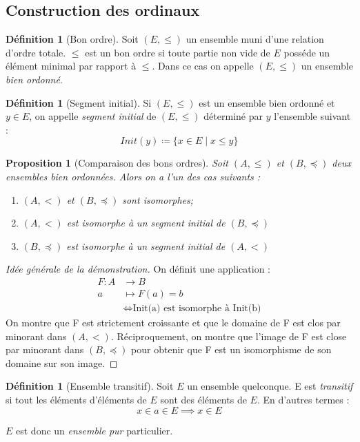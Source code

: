 \documentclass[french]{article}
\theoremstyle{definition}
\newtheorem{definition}[subsubsection]{Définition}
\theoremstyle{plain}
\newtheorem{proposition}[subsubsection]{Proposition}
\theoremstyle{plain}
\theoremstyle{plain}
\theoremstyle{plain}
\theoremstyle{plain}
\begin{document}
\subsection{Construction des ordinaux} 

\begin{definition}[Bon ordre]
	Soit \( (E,\le) \) un ensemble muni d'une relation d'ordre totale. \( \le \) est un bon ordre si toute partie non vide de \( E \) posséde un élément minimal par rapport à \( \le \). Dans ce cas on appelle \( (E,\le) \) un ensemble \textit{bien ordonné}.	
\end{definition}

\begin{definition}[Segment initial]
	Si \( (E,\le) \) est un ensemble bien ordonné et \( y \in E\), on appelle \textit{segment initial} de \( (E,\le) \) déterminé par \( y \) l'ensemble suivant :
	\begin{equation*}
		Init(y) \coloneqq \{ x \in E \mid x \le y \}
	\end{equation*}
\end{definition}

\begin{proposition}[Comparaison des bons ordres]
	Soit \( (A,\le) \) et \( (B,\preceq) \) deux ensembles bien ordonnées. Alors on a l'un des cas suivants :
	\begin{enumerate}[label = (\roman*)]
		\item \( (A,<) \) et \( (B,\preceq) \) sont isomorphes;
		\item \( (A,<) \) est isomorphe à un segment initial de \( (B,\preceq) \)
		\item \( (B,\preceq) \) est isomorphe à un segment initial de \( (A,<) \)
	\end{enumerate}
\end{proposition}
\begin{proof}[Idée générale de la démonstration]
	On définit une application :
	\begin{align*}
		F : A &\rightarrow B \\
		a &\mapsto F(a) = b \\
			       &\Leftrightarrow \text{Init(a) est isomorphe à Init(b)}
	\end{align*}
	On montre que F est strictement croissante et que le domaine de F est clos par minorant dans \( (A,<) \). Réciproquement, on montre que l'image de F est close par minorant dans \( (B,\preceq) \) pour obtenir que F est un isomorphisme de son domaine sur son image.
\end{proof}
\begin{definition}[Ensemble transitif]
	Soit \( E \) un ensemble quelconque. E est \textit{transitif} si tout les éléments d'éléments de \( E \) sont des éléments de \( E \). En d'autres termes :
	\begin{equation}\label{eq:Tr} \tag{Tr}
		x \in a \in E \implies x \in E 
	\end{equation}

	\( E \) est donc un \textit{ensemble pur} particulier.  \cite{nlab:pure_set} \cite{nlab:transitive_set} 
\end{definition}
\end{document}
